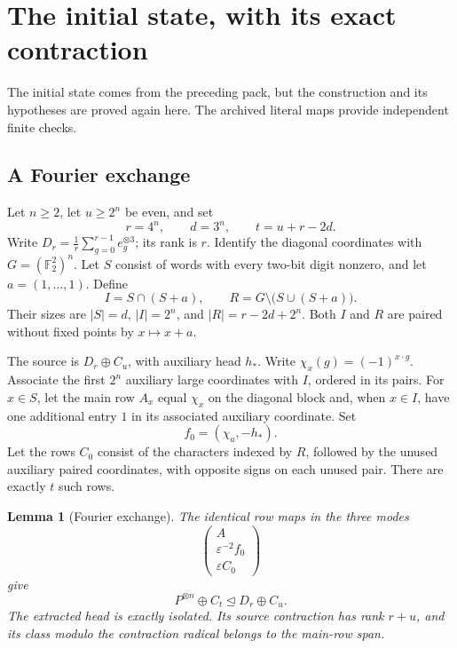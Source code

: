 \documentclass[11pt]{article}
\newtheorem{lemma}[theorem]{Lemma}
\theoremstyle{definition}\newtheorem{definition}[theorem]{Definition}
\theoremstyle{remark}\newtheorem{remark}[theorem]{Remark}
\newcommand{\F}{\mathbb F}
\begin{document}
\section{The initial state, with its exact contraction}\label{sec:initial}

The initial state comes from the preceding pack, but the construction and its hypotheses are proved again here. The archived literal maps provide independent finite checks.

\subsection{A Fourier exchange}

Let $n\geq2$, let $u\geq2^n$ be even, and set
\[
 r=4^n,\qquad d=3^n,\qquad t=u+r-2d.
\]
Write $D_r=\frac1r\sum_{g=0}^{r-1}e_g^{\otimes3}$; its rank is $r$. Identify the diagonal coordinates with $G=(\F_2^2)^n$. Let $S$ consist of words with every two-bit digit nonzero, and let $a=(1,\ldots,1)$. Define
\[
 I=S\cap(S+a),\qquad R=G\setminus\bigl(S\cup(S+a)\bigr).
\]
Their sizes are $|S|=d$, $|I|=2^n$, and $|R|=r-2d+2^n$. Both $I$ and $R$ are paired without fixed points by $x\mapsto x+a$.

The source is $D_r\oplus C_u$, with auxiliary head $h_*$. Write $\chi_x(g)=(-1)^{x\cdot g}$. Associate the first $2^n$ auxiliary large coordinates with $I$, ordered in its pairs. For $x\in S$, let the main row $A_x$ equal $\chi_x$ on the diagonal block and, when $x\in I$, have one additional entry $1$ in its associated auxiliary coordinate. Set
\[
 f_0=(\chi_a,-h_*).
\]
Let the rows $C_0$ consist of the characters indexed by $R$, followed by the unused auxiliary paired coordinates, with opposite signs on each unused pair. There are exactly $t$ such rows.

\begin{lemma}[Fourier exchange]\label{lem:fourier}
The identical row maps in the three modes
\[
 \begin{pmatrix}A\\ \varepsilon^{-2}f_0\\ \varepsilon C_0\end{pmatrix}
\]
give
\begin{equation}\label{eq:fourier}
 P^{\otimes n}\oplus C_t\unlhd D_r\oplus C_u.
\end{equation}
The extracted head is exactly isolated. Its source contraction has rank $r+u$, and its class modulo the contraction radical belongs to the main-row span.
\end{lemma}
\end{document}
